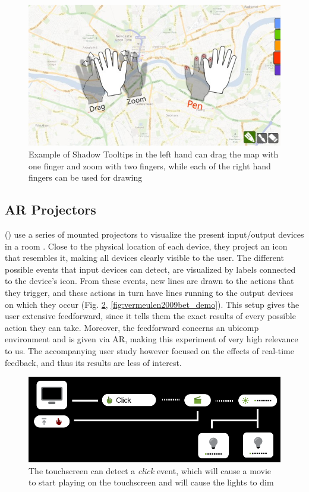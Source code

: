 \documentclass[a4paper]{article}
\begin{document}
	\begin{figure}
		\centering
		\includegraphics[width=0.7\linewidth]{img/freitag2012enhanced/demo.png}
		\caption{Example of Shadow Tooltips in the left hand can drag the map with one finger and zoom with two fingers, while each of the right hand fingers can be used for drawing \cite{freitag2012enhanced}}
		\label{fig:freitag2012enhanced_demo}
	\end{figure}

	\subsection{AR Projectors} \label{subsec:ar_projectors}
	\citeauthor{vermeulen2009bet} (\citeyear{vermeulen2009bet}) use a series of mounted projectors to visualize the present input/output devices in a room \cite{vermeulen2009bet}. Close to the physical location of each device, they project an icon that resembles it, making all devices clearly visible to the user. The different possible events that input devices can detect, are visualized by labels connected to the device's icon. From these events, new lines are drawn to the actions that they trigger, and these actions in turn have lines running to the output devices on which they occur (Fig. \ref{fig:vermeulen2009bet_mockup}, \ref{fig:vermeulen2009bet_demo}). This setup gives the user extensive feedforward, since it tells them the exact results of every possible action they can take. Moreover, the feedforward concerns an ubicomp environment and is given via AR, making this experiment of very high relevance to us. The accompanying user study however focused on the effects of real-time feedback, and thus its results are less of interest.
	
	\begin{figure}
		\centering
		\includegraphics[width=0.7\linewidth]{img/vermeulen2009bet/mockup.png}
		\caption{The touchscreen can detect a \textit{click} event, which will cause a movie to start playing on the touchscreen and will cause the lights to dim \cite{vermeulen2009bet}}
		\label{fig:vermeulen2009bet_mockup}
	\end{figure}
	
\end{document}
